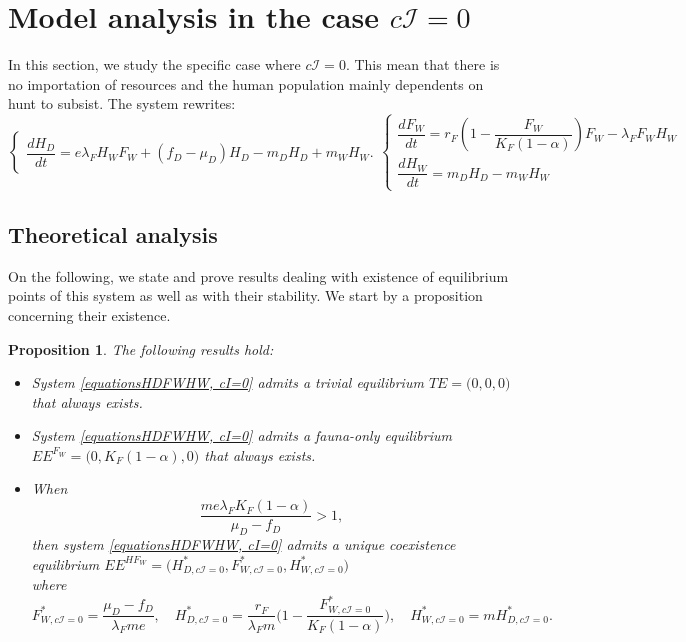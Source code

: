 \documentclass{article}
\newcommand{\lfw}{\lambda_{F}}
\newcommand{\lfw}{\lambda_{F}}
\newcommand{\cI}{c \mathcal{I}}
\newtheorem{prop}{Proposition}
\begin{document}
\section{Model analysis in the case $\cI = 0$}
In this section, we study the specific case where $\cI = 0$. This mean that there is no importation of resources and the human population mainly dependents on hunt to subsist. The system rewrites:
\begin{subequations}
\begin{equation}
\left\{ \begin{array}{l}
\dfrac{dH_D}{dt}= e\lfw H_W F_W + (f_D - \mu_D) H_D - m_D H_D + m_W H_W.
\end{array}\right.
\end{equation}
\begin{equation}
\left\lbrace \begin{array}{l}
\dfrac{dF_W}{dt} = r_F \left(1 - \dfrac{F_W}{K_F(1-\alpha)} \right) F_W - \lfw F_W H_W \\
\dfrac{dH_W}{dt}= m_D H_D - m_W H_W 
\end{array} \right.
\end{equation}
\label{equationsHDFWHW, cI=0}
\end{subequations}

\subsection{Theoretical analysis}
On the following, we state and prove results dealing with existence of equilibrium points of this system as well as with their stability. We start by a proposition concerning their existence.


\begin{prop}
\label{theoremEquilibre, cI=0}
The following results hold:
\begin{itemize}
\item System \eqref{equationsHDFWHW, cI=0} admits a trivial equilibrium $TE = \Big(0,0,0\Big)$ that always exists.
\item System \eqref{equationsHDFWHW, cI=0} admits a fauna-only equilibrium $EE^{F_W} = \Big(0, K_F(1-\alpha), 0 \Big)$ that always exists.
\item When
$$
\dfrac{m e \lfw K_F(1-\alpha)}{\mu_D - f_D} >1,
$$ 
then system \eqref{equationsHDFWHW, cI=0} admits a unique coexistence equilibrium $EE^{HF_W} = \Big(H^*_{D, \cI = 0}, F^*_{W, \cI = 0}, H^*_{W, \cI = 0} \Big)$ \\ 
where 
$$F^*_{W, \cI = 0} = \dfrac{\mu_D - f_D}{\lfw m e},
\quad 
H^*_{D, \cI = 0} = \dfrac{r_F}{\lfw m} \Big(1 - \dfrac{F^*_{W, \cI = 0}}{K_F(1-\alpha)} \Big),
\quad 
H^*_{W, \cI = 0} = m H^*_{D, \cI = 0}.$$
\end{itemize}
\end{prop}
\end{document}
